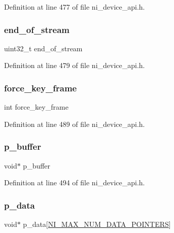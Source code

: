 Definition at line 477 of file ni\+\_\+device\+\_\+api.\+h.

\mbox{\label{struct__ni__frame_a7cd60f79487efa52ff89303532a085fb}} 
\subsubsection{\texorpdfstring{end\_of\_stream}{end\_of\_stream}}
{\footnotesize\ttfamily uint32\+\_\+t end\+\_\+of\+\_\+stream}



Definition at line 479 of file ni\+\_\+device\+\_\+api.\+h.

\mbox{\label{struct__ni__frame_a0c0dbb0d46bfff00f7a71a8ea2e993ab}} 
\subsubsection{\texorpdfstring{force\_key\_frame}{force\_key\_frame}}
{\footnotesize\ttfamily int force\+\_\+key\+\_\+frame}



Definition at line 489 of file ni\+\_\+device\+\_\+api.\+h.

\mbox{\label{struct__ni__frame_ac5f1b38d538f42b0a45acd833ea5fc65}} 
\subsubsection{\texorpdfstring{p\_buffer}{p\_buffer}}
{\footnotesize\ttfamily void$\ast$ p\+\_\+buffer}



Definition at line 494 of file ni\+\_\+device\+\_\+api.\+h.

\mbox{\label{struct__ni__frame_a13127a830580c25a1fbd82987057af9a}} 
\subsubsection{\texorpdfstring{p\_data}{p\_data}}
{\footnotesize\ttfamily void$\ast$ p\+\_\+data\mbox{[}\mbox{\hyperlink{ni__device__api_8h_a31f22c2de7d8a94f2e33552cf704545a}{N\+I\+\_\+\+M\+A\+X\+\_\+\+N\+U\+M\+\_\+\+D\+A\+T\+A\+\_\+\+P\+O\+I\+N\+T\+E\+RS}}\mbox{]}}



